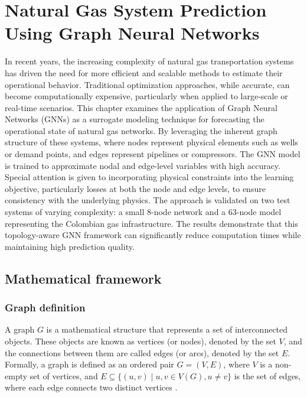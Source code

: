 \chapter{Natural Gas System Prediction Using Graph Neural Networks} \label{cap:lienal-censnet}

In recent years, the increasing complexity of natural gas transportation systems has driven the need for more efficient and scalable methods to estimate their operational behavior. Traditional optimization approaches, while accurate, can become computationally expensive, particularly when applied to large-scale or real-time scenarios. This chapter examines the application of Graph Neural Networks (GNNs) as a surrogate modeling technique for forecasting the operational state of natural gas networks. By leveraging the inherent graph structure of these systems, where nodes represent physical elements such as wells or demand points, and edges represent pipelines or compressors. The GNN model is trained to approximate nodal and edge-level variables with high accuracy. Special attention is given to incorporating physical constraints into the learning objective, particularly losses at both the node and edge levels, to ensure consistency with the underlying physics. The approach is validated on two test systems of varying complexity: a small 8-node network and a 63-node model representing the Colombian gas infrastructure. The results demonstrate that this topology-aware GNN framework can significantly reduce computation times while maintaining high prediction quality.



\section{Mathematical framework}

\subsection{Graph definition}


A graph $G$ is a mathematical structure that represents a set of interconnected objects. These objects are known as vertices (or nodes), denoted by the set $V$, and the connections between them are called edges (or arcs), denoted by the set $E$. Formally, a graph is defined as an ordered pair $G = (V, E)$, where $V$ is a non-empty set of vertices, and $E \subseteq \{(u, v) \mid u, v \in V(G), u \neq v\}$ is the set of edges, where each edge connects two distinct vertices \cite{Trudeau_2015}.

